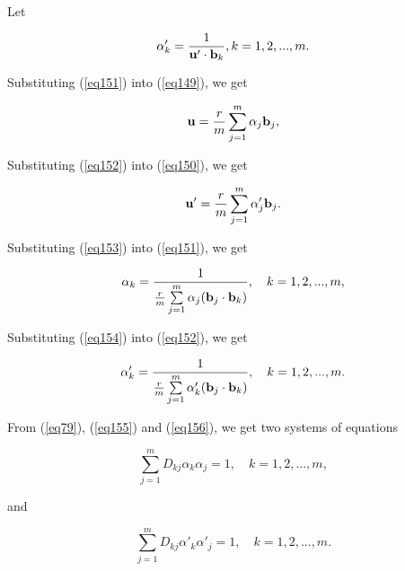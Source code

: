 \documentclass [18pt]{article}
\begin{document}
Let


\begin{equation}
\label{eq152}
\alpha '_k = \frac{1}{{\rm {\bf u}}' \cdot {\rm {\bf b}}_k },
k = 1,2,...,m.
\end{equation}



Substituting (\ref{eq151}) into (\ref{eq149}), we get


\begin{equation}
\label{eq153}
{\rm {\bf u}} = \frac{r}{m}\sum\limits_{j = 1}^m {\alpha _j {\rm {\bf b}}_j
} ,
\end{equation}



Substituting (\ref{eq152}) into (\ref{eq150}), we get


\begin{equation}
\label{eq154}
{\rm {\bf u}}' = \frac{r}{m}\sum\limits_{j = 1}^m {\alpha '_j {\rm {\bf
b}}_j } .
\end{equation}



Substituting (\ref{eq153}) into (\ref{eq151}), we get


\begin{equation}
\label{eq155}
\alpha _k = \frac{1}{\frac{r}{m}\sum\limits_{j = 1}^m {\alpha _j ({\rm {\bf
b}}_j \cdot {\rm {\bf b}}_k )} },
\quad
k = 1,2,...,m,
\end{equation}



Substituting (\ref{eq154}) into (\ref{eq152}), we get


\begin{equation}
\label{eq156}
\alpha '_k = \frac{1}{\frac{r}{m}\sum\limits_{j = 1}^m {\alpha '_k ({\rm
{\bf b}}_j \cdot {\rm {\bf b}}_k )} },
\quad
k = 1,2,...,m.
\end{equation}



From (\ref{eq79}), (\ref{eq155}) and (\ref{eq156}), we get two systems of equations


\begin{equation}
\label{eq157}
\sum\limits_{j = 1}^m {D_{kj} \alpha _k \alpha _j = 1} ,
\quad
k = 1,2,...,m,
\end{equation}



\noindent
and


\begin{equation}
\label{eq158}
\sum\limits_{j = 1}^m {D_{kj} \alpha '_k \alpha '_j = 1} ,
\quad
k = 1,2,...,m.
\end{equation}
\end{document}
